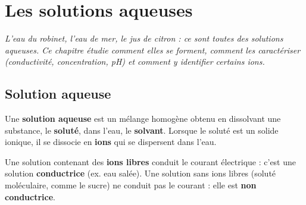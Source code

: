 \chapter{Les solutions aqueuses}

\noindent\textit{L'eau du robinet, l'eau de mer, le jus de citron : ce sont toutes des
solutions aqueuses. Ce chapitre étudie comment elles se forment, comment les caractériser
(conductivité, concentration, pH) et comment y identifier certains ions.}
\vspace{8pt}

\connecteBanner

\section{Solution aqueuse}

\begin{definition}
Une \textbf{solution aqueuse} est un mélange homogène obtenu en dissolvant une substance,
le \textbf{soluté}, dans l'eau, le \textbf{solvant}. Lorsque le soluté est un solide
ionique, il se dissocie en \textbf{ions} qui se dispersent dans l'eau.
\end{definition}

\begin{illus}
\end{illus}

\begin{propriete}
Une solution contenant des \textbf{ions libres} conduit le courant électrique : c'est une
solution \textbf{conductrice} (ex. eau salée). Une solution sans ions libres (soluté
moléculaire, comme le sucre) ne conduit pas le courant : elle est \textbf{non
conductrice}.
\end{propriete}

